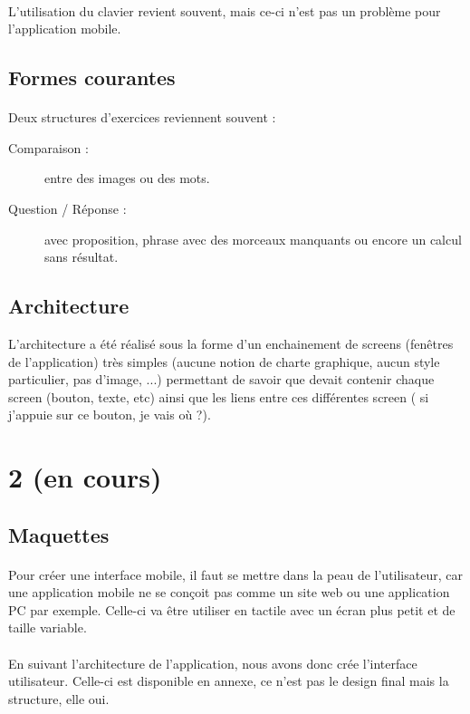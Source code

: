 \documentclass[french]{report}
\begin{document}
\paragraph{}L'utilisation du clavier revient souvent, mais ce-ci n'est pas un problème pour l'application mobile.

\subsection{Formes courantes}
\paragraph{}Deux structures d'exercices reviennent souvent :
\begin{description}
\item[Comparaison : ] entre des images ou des mots.
\item[Question / Réponse : ] avec proposition, phrase avec des morceaux manquants ou encore un calcul sans résultat.
\end{description}
\subsection{Architecture}
L'architecture a été réalisé sous la forme d'un enchainement de screens (fenêtres de l'application) très simples (aucune notion de charte graphique, aucun style particulier, pas d'image, ...) permettant de savoir que devait contenir chaque screen (bouton, texte, etc) ainsi que les liens entre ces différentes screen (\og{} si j'appuie sur ce bouton, je vais où ?\fg{}).
\section{2\ieme{} \sprint{} (en cours)}
\label{sprint2}
\subsection{Maquettes}
\paragraph{}Pour créer une interface mobile, il faut se mettre dans la peau de l'utilisateur, car une application mobile ne se conçoit pas comme un site web ou une application PC par exemple. Celle-ci va être utiliser en tactile avec un écran plus petit et de taille variable.

\paragraph{}En suivant l'architecture de l'application, nous avons donc crée l'interface utilisateur. Celle-ci est disponible en annexe, ce n'est pas le design final mais la structure, elle oui.
\end{document}
